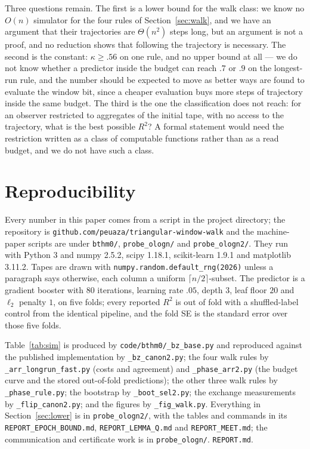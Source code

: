 \documentclass[11pt]{article}
\begin{document}
Three questions remain. The first is a lower bound for the walk class: we know no $O(n)$ simulator for
the four rules of Section~\ref{sec:walk}, and we have an argument that their trajectories are
$\Theta(n^2)$ steps long, but an argument is not a proof, and no reduction shows that following the
trajectory is necessary. The second is the constant: $\kappa\ge.56$ on one rule, and no
upper bound at all --- we do not know whether a predictor inside the budget can reach $.7$ or $.9$ on
the longest-run rule, and the number should be expected to move as better ways are found to evaluate
the window bit, since a cheaper evaluation buys more steps of trajectory inside the same budget. The
third is the one the classification does not reach: for an observer restricted to aggregates of the
initial tape, with no access to the trajectory, what is the best possible $R^2$? A formal statement
would need the restriction written as a class of computable functions rather than as a read budget,
and we do not have such a class.

\section*{Reproducibility}

Every number in this paper comes from a script in the project directory; the repository is
\texttt{github.com/peuaza/triangular-window-walk} and the machine-paper scripts are under
\texttt{bthm0/}, \texttt{probe\_ologn/} and \texttt{probe\_ologn2/}. They run with Python 3 and numpy 2.5.2,
scipy 1.18.1, scikit-learn 1.9.1 and matplotlib 3.11.2. Tapes are drawn with
\texttt{numpy.random.default\_rng(2026)} unless a paragraph says otherwise, each column a uniform
$\lceil n/2\rceil$-subset. The predictor is a gradient booster with 80 iterations, learning rate
$.05$, depth $3$, leaf floor $20$ and $\ell_2$ penalty $1$, on five folds; every reported $R^2$ is
out of fold with a shuffled-label control from the identical pipeline, and the fold SE is the
standard error over those five folds.

Table~\ref{tab:sim} is produced by \texttt{code/bthm0/\_bz\_base.py} and reproduced against the
published implementation by \texttt{\_bz\_canon2.py}; the four walk rules by
\texttt{\_arr\_longrun\_fast.py} (costs and agreement) and \texttt{\_phase\_arr2.py} (the budget
curve and the stored out-of-fold predictions); the other three walk rules by
\texttt{\_phase\_rule.py}; the bootstrap by \texttt{\_boot\_sel2.py}; the exchange measurements by
\texttt{\_flip\_canon2.py}; and the figures by \texttt{\_fig\_walk.py}. Everything in
Section~\ref{sec:lower} is in \texttt{probe\_ologn2/}, with the tables and commands in its
\texttt{REPORT\_EPOCH\_BOUND.md}, \texttt{REPORT\_LEMMA\_Q.md} and \texttt{REPORT\_MEET.md}; the
communication and certificate work is in \texttt{probe\_ologn/}.
\texttt{REPORT.md}.
\end{document}
